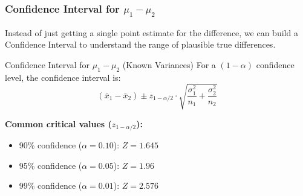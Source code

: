 \subsubsection{Confidence Interval for $\mu_1 - \mu_2$}

Instead of just getting a single point estimate for the difference, we can build a Confidence Interval to understand the range of plausible true differences.

\begin{defbox}{Confidence Interval for $\mu_1 - \mu_2$ (Known Variances)}
For a $(1-\alpha)$ confidence level, the confidence interval is:
\begin{equation}
(\bar{x}_1 - \bar{x}_2) \pm z_{1-\alpha/2} \cdot \sqrt{\frac{\sigma_1^2}{n_1} + \frac{\sigma_2^2}{n_2}}
\end{equation}

\textbf{Common critical values ($z_{1-\alpha/2}$):}
\begin{itemize}
    \item 90\% confidence ($\alpha = 0.10$): $Z = 1.645$
    \item 95\% confidence ($\alpha = 0.05$): $Z = 1.96$
    \item 99\% confidence ($\alpha = 0.01$): $Z = 2.576$
\end{itemize}
\end{defbox}

